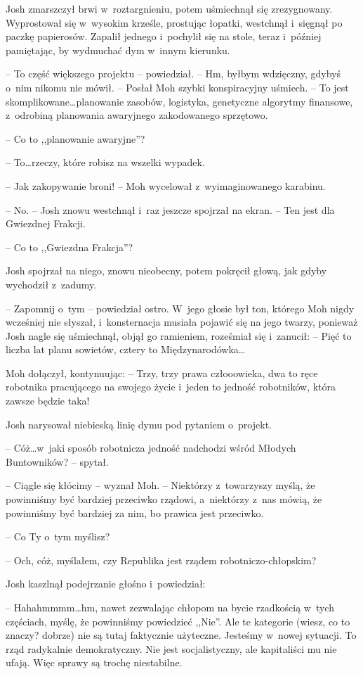 \documentclass[oneside,polish,11pt,sfheadings]{mwbk}
\begin{document}
Josh zmarszczył brwi w~roztargnieniu, potem uśmiechnął się zrezygnowany.
Wyprostował się w~wysokim krześle, prostując łopatki, westchnął i~sięgnął po paczkę papierosów. Zapalił jednego i~pochylił się na stole,
teraz i~później pamiętając, by wydmuchać dym w~innym kierunku.

-- To część większego projektu -- powiedział. -- Hm, byłbym wdzięczny,
gdybyś o~nim nikomu nie mówił. -- Posłał Moh szybki konspiracyjny
uśmiech. -- To jest skomplikowane\ldots planowanie zasobów, logistyka,
genetyczne algorytmy finansowe, z~odrobiną planowania awaryjnego
zakodowanego sprzętowo.

-- Co to ,,planowanie awaryjne''?

-- To\ldots rzeczy, które robisz na wszelki wypadek.

-- Jak zakopywanie broni! -- Moh wycelował z~wyimaginowanego karabinu.

-- No. -- Josh znowu westchnął i~raz jeszcze spojrzał na ekran. -- Ten jest
dla Gwiezdnej Frakcji.

-- Co to ,,Gwiezdna Frakcja''?

Josh spojrzał na niego, znowu nieobecny, potem pokręcił głową, jak gdyby
wychodził z~zadumy.

-- Zapomnij o~tym -- powiedział ostro. W~jego głosie był ton, którego Moh
nigdy wcześniej nie słyszał, i~konsternacja musiała pojawić się na jego
twarzy, ponieważ Josh nagle się uśmiechnął, objął go ramieniem,
roześmiał się i~zanucił: -- Pięć to liczba lat planu sowietów, cztery to
Międzynarodówka\ldots

Moh dołączył, kontynuując: -- Trzy, trzy prawa człooowieka, dwa to ręce
robotnika pracującego na swojego życie i~jeden to jedność robotników,
która zawsze będzie taka!

Josh narysował niebieską linię dymu pod pytaniem o~projekt. 

-- Cóż\ldots w~jaki sposób robotnicza jedność nadchodzi wśród Młodych Buntowników? -- spytał.

-- Ciągle się kłócimy -- wyznał Moh. -- Niektórzy z~towarzyszy myślą, że
powinniśmy być bardziej przeciwko rządowi, a~niektórzy z~nas mówią, że
powinniśmy być bardziej za nim, bo prawica jest przeciwko.

-- Co Ty o~tym myślisz?

-- Och, cóż, myślałem, czy Republika jest rządem robotniczo-chłopskim?

Josh kaszlnął podejrzanie głośno i~powiedział: 

-- Hahahmmmm\ldots hm, nawet
zezwalając chłopom na bycie rzadkością w~tych częściach, myślę, że
powinniśmy powiedzieć ,,Nie''. Ale te kategorie (wiesz, co to znaczy?
dobrze) nie są tutaj faktycznie użyteczne. Jesteśmy w~nowej sytuacji. To
rząd radykalnie demokratyczny. Nie jest socjalistyczny, ale kapitaliści
mu nie ufają. Więc sprawy są trochę niestabilne.
\end{document}
